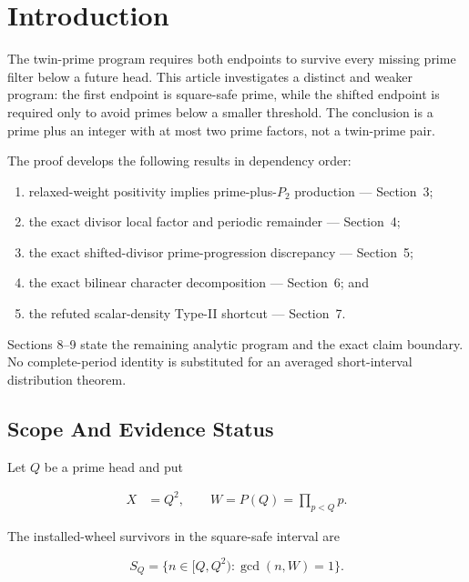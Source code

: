 \section{Introduction}

The twin-prime program requires both endpoints to survive every missing prime
filter below a future head. This article investigates a distinct and weaker
program: the first endpoint is square-safe prime, while the shifted endpoint
is required only to avoid primes below a smaller threshold. The conclusion is
a prime plus an integer with at most two prime factors, not a twin-prime pair.

The proof develops the following results in dependency order:

\begin{enumerate}
\item relaxed-weight positivity implies prime-plus-$P_2$ production --- Section~3;
\item the exact divisor local factor and periodic remainder --- Section~4;
\item the exact shifted-divisor prime-progression discrepancy --- Section~5;
\item the exact bilinear character decomposition --- Section~6; and
\item the refuted scalar-density Type-II shortcut --- Section~7.
\end{enumerate}

Sections 8--9 state the remaining analytic program and the exact claim
boundary. No complete-period identity is substituted for an averaged
short-interval distribution theorem.

\subsection{Scope And Evidence Status}

Let $Q$ be a prime head and put

\begin{equation*}
\begin{aligned}
X&=Q^2,
\qquad
W=P(Q)=\prod_{p\lt Q}p.
\end{aligned}
\end{equation*}

The installed-wheel survivors in the square-safe interval are

\begin{equation*}
S_Q
=
\{n\in[Q,Q^2):\gcd(n,W)=1\}.
\end{equation*}

